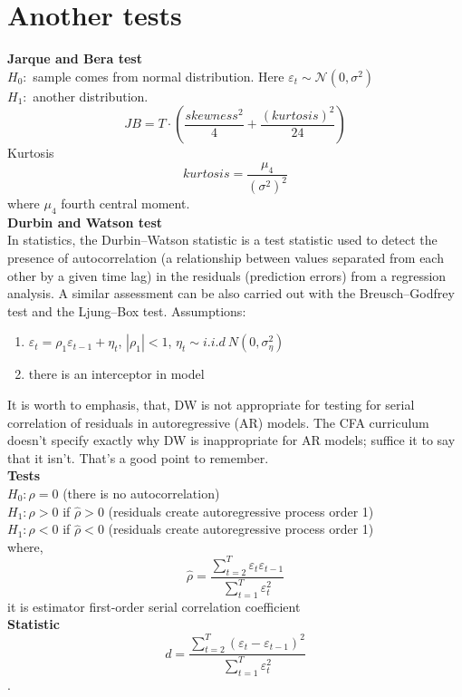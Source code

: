 \documentclass{book}
\begin{document}
\section{Another tests}
\textbf{Jarque and Bera test}\\
$H_{0}:$ sample comes from normal distribution. Here $\varepsilon_{t}\sim \mathcal{N}(0,\sigma^{2})$\\
$H_{1}:$ another distribution.\\
$$
\nonumber
JB=T\cdot\left(\frac{skewness^{2}}{4}+\frac{(kurtosis)^2}{24}\right)
$$
Kurtosis
\begin{equation}
\nonumber
kurtosis=\frac{\mu_{4}}{({\sigma^{2}})^2}
\end{equation}
where $\mu_{4}$ fourth central moment.\\
\textbf{Durbin and Watson test}\\
In statistics, the Durbin–Watson statistic is a test statistic used to detect the presence of autocorrelation (a relationship between values separated from each other by a given time lag) in the residuals (prediction errors) from a regression analysis. A similar assessment can be also carried out with the Breusch–Godfrey test and the Ljung–Box test.
Assumptions:\\
\begin{enumerate}
\item $\varepsilon_{t}=\rho_{1}\varepsilon_{t-1}+\eta_{t}$, $|\rho_{1}|<1$, $\eta_{t}\sim i.i.d\  N(0,\sigma_{\eta}^{2})$
\item there is an interceptor in model
\end{enumerate}
It is worth to emphasis, that, DW is not appropriate for testing for serial correlation of residuals in autoregressive (AR) models. The CFA curriculum doesn't specify exactly why DW is inappropriate for AR models; suffice it to say that it isn't.  That's a good point to remember.\\
\textbf{Tests}\\
$H_{0}:\rho = 0$ (there is no autocorrelation)\\
$H_{1}:\rho>0$ if $\hat{\rho}>0$ (residuals create autoregressive process order 1)\\ 
$H_{1}:\rho<0$ if $\hat{\rho}<0$ (residuals create autoregressive process order 1)\\ 
where, 
\begin{equation}
\nonumber
\hat{\rho}=\frac{\sum_{t=2}^{T}\varepsilon_{t}\varepsilon_{t-1}}{\sum_{t=1}^{T}\varepsilon_{t}^{2}}
\end{equation}
it is estimator first-order serial correlation coefficient\\
\textbf{Statistic}
\begin{equation}
\nonumber
d=\frac{\sum_{t=2}^{T}(\varepsilon_{t}-\varepsilon_{t-1})^{2}}{\sum_{t=1}^{T}\varepsilon_{t}^{2}}
\end{equation}.
\end{document}
